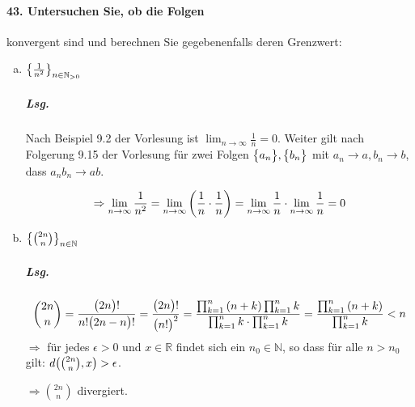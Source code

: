 \documentclass{scrreprt}
\begin{document}
\paragraph{43. Untersuchen Sie, ob die Folgen} konvergent sind und berechnen Sie
gegebenenfalls deren Grenzwert:
\begin{enumerate}[(a)]
\item $\qty{\frac{1}{n^2}}_{n \in \mathbb{N}_{> 0}}$
  \subparagraph{Lsg.} Nach Beispiel 9.2 der Vorlesung ist
  $\lim_{n \to \infty} \frac{1}{n} = 0$.
  Weiter gilt nach Folgerung 9.15 der Vorlesung für zwei
  Folgen $\qty\big{a_n}, \qty\big{b_n}$ mit $a_n \to a, b_n \to b$,
  dass $a_nb_n \to ab$.

  \[
    \Rightarrow \lim_{n \to \infty} \frac{1}{n^2}
    = \lim_{n \to \infty} \qty(\frac{1}{n} \cdot \frac{1}{n})
    = \lim_{n \to \infty} \frac{1}{n} \cdot \lim_{n \to \infty} \frac{1}{n}
    = 0
  \]
\item $\qty{\binom{2n}{n}}_{n \in \mathbb{N}}$

  \subparagraph{Lsg.}
  \[
    \binom{2n}{n} = \frac{\qty\big(2n)!}{n!\qty\big(2n - n)!}
    = \frac{\qty\big(2n)!}{\qty\big(n!)^2}
    = \frac{\prod_{k = 1}^{n}\qty(n + k) \prod_{k = 1}^n k}{\prod_{k = 1}^n k \cdot \prod_{k = 1}^n k}
    = \frac{\prod_{k = 1}^{n}\qty(n + k)}{\prod_{k = 1}^n k}
    < n
  \]
  $\Rightarrow$ für jedes $\epsilon > 0$ und $x \in \mathbb{R}$ findet sich ein
  $n_0 \in \mathbb{N}$, so dass für alle $n > n_0$ gilt:
  $d\qty(\binom{2n}{n}, x) > \epsilon$.

  $\Rightarrow \binom{2n}{n}$ divergiert.
\end{enumerate}
\end{document}
